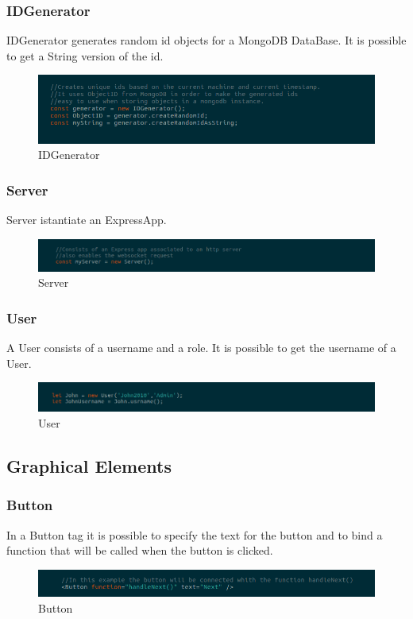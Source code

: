 \subsubsection{IDGenerator}
IDGenerator generates random id objects for a MongoDB DataBase. It is possible to get a String version of the id.
\begin{figure}[H]
	\centering
	\includegraphics[width=14cm]{../../documenti/UserManualFramework/framework_model/idGenerator.png}
	\caption{IDGenerator}
\end{figure}

\subsubsection{Server}
Server istantiate an ExpressApp.
\begin{figure}[H]
	\centering
	\includegraphics[width=14cm]{../../documenti/UserManualFramework/framework_model/Server.png}
	\caption{Server}
\end{figure}

\subsubsection{User}
A User consists of a username and a role. It is possible to get the username of a User.
\begin{figure}[H]
	\centering
	\includegraphics[width=14cm]{../../documenti/UserManualFramework/framework_model/User.png}
	\caption{User}
\end{figure}

\subsection{Graphical Elements}\label{GraphicalElements}
\subsubsection{Button}
In a Button tag it is possible to specify the text for the button and to bind a function that will be called when the button is clicked.
\begin{figure}[H]
	\centering
	\includegraphics[width=14cm]{../../documenti/UserManualFramework/framework_view/11framework_view_button.png}
	\caption{Button}
\end{figure}

